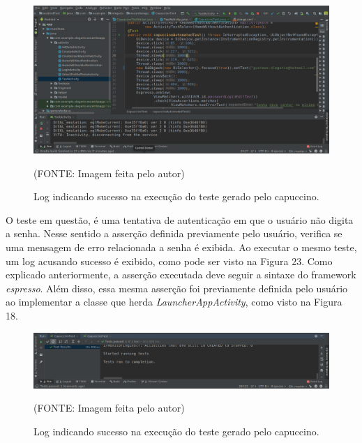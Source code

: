 \documentclass[
    12pt,       %
    openright,      %
    twoside,      %
    a4paper,      %
    english,      %
    french,       %
    spanish,      %
    brazil,       %
    ]{abntex2}
\begin{document}
      \begin{figure}[htbp]
        \begin{center}
          \includegraphics[width=1.0\textwidth]{img/capuccinoAutomatedTest.png}
            \end{center}
          \caption{\label{fig:passaro} Log indicando sucesso na execução do teste gerado pelo capuccino.}
        \begin{center}(FONTE: Imagem feita pelo autor)\end{center}
      \end{figure}

      O teste em questão, é uma tentativa de autenticação em que o usuário não digita a senha. Nesse sentido
      a asserção definida previamente pelo usuário, verifica se uma mensagem de erro relacionada a senha é
      exibida. Ao executar o mesmo teste, um log acusando sucesso é exibido, como pode ser visto na Figura 23.
      Como explicado anteriormente, a asserção executada deve seguir a sintaxe do framework \textit{espresso}.
      Além disso, essa mesma asserção foi previamente definida pelo usuário ao implementar a classe que herda
      \textit{LauncherAppActivity}, como visto na Figura 18.

      \begin{figure}[htbp]
        \begin{center}
          \includegraphics[width=1.0\textwidth]{img/capuccinoSucess.png}
            \end{center}
          \caption{\label{fig:passaro} Log indicando sucesso na execução do teste gerado pelo capuccino.}
        \begin{center}(FONTE: Imagem feita pelo autor)\end{center}
      \end{figure}
\end{document}

